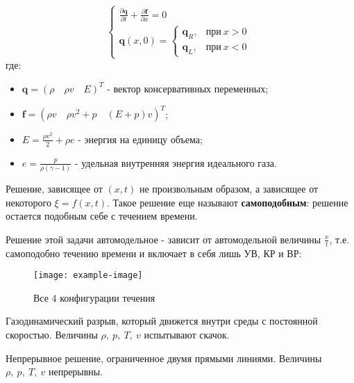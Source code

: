 \begin{equation}
	\begin{cases}
		\frac{\partial \pmb{q}}{\partial t} + \frac{\partial \pmb{f}}{\partial x} = 0\\
		\pmb{q}(x, 0) =
		\begin{cases}
			\pmb{q}_R,&\text{при}\ x>0\\
			\pmb{q}_L,&\text{при}\ x<0
		\end{cases}
	\end{cases}
\end{equation}
где:
\begin{itemize}
	\item $\pmb{q} = (\rho\quad \rho v\quad E)^T$ - вектор консервативных переменных;
	\item $\pmb{f} = (\rho v\quad \rho v^2 + p\quad (E+p)v)^T$;
	\item $E = \frac{\rho v^2}{2} + \rho e$ - энергия на единицу объема;
	\item $e = \frac{p}{\rho(\gamma - 1)}$ - удельная внутренняя энергия идеального газа.
\end{itemize}

\begin{definition}
	Решение, зависящее от $(x, t)$ не произвольным образом, а зависящее от некоторого $\xi = f(x,t)$. Такое решение еще называют \textbf{самоподобным}: решение остается подобным себе с течением времени.
\end{definition}

Решение этой задачи автомодельное - зависит от автомодельной величины $\frac{x}{t}$, т.е. самоподобно течению времени и включает в себя лишь УВ, КР и ВР:

\begin{figure}[H]
	\centering
	
	\texttt{[image: example-image]}
	\caption{Все 4 конфигурации течения}
	\label{fig_4configs}
\end{figure}

\begin{definition}
	Газодинамический разрыв, который движется внутри среды с постоянной скоростью. Величины $\rho,\ p,\ T,\ v$ испытывают скачок.
\end{definition}

\begin{definition}
	Непрерывное решение, ограниченное двумя прямыми линиями. Величины $\rho,\ p,\ T,\ v$ непрерывны.
\end{definition}

